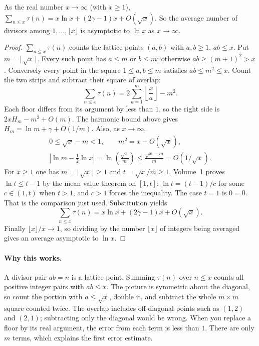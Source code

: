 \begin{theorem}[Dirichlet]\label{thm:hyperbola}
As the real number $x\to\infty$ (with $x\ge1$),
$\displaystyle\sum_{n\le x}\tau(n)=x\ln x+(2\gamma-1)x+O(\sqrt x)$. So the average number of divisors among $1,\dots,\lfloor x\rfloor$ is asymptotic to $\ln x$ as $x\to\infty$.
\end{theorem}
\begin{proof}
$\sum_{n\le x}\tau(n)$ counts the lattice points $(a,b)$ with $a,b\ge1$, $ab\le x$. Put $m=\lfloor\sqrt x\rfloor$.
Every such point has $a\le m$ or $b\le m$: otherwise
$ab\ge(m+1)^2>x$. Conversely every point in the square
$1\le a,b\le m$ satisfies $ab\le m^2\le x$.
Count the two strips and subtract their square of overlap:
\[
\sum_{n\le x}\tau(n)=2\sum_{a=1}^m\left\lfloor\frac xa\right\rfloor-m^2.
\]
Each floor differs from its argument by less than $1$, so
the right side is $2xH_m-m^2+O(m)$.
The harmonic bound above gives $H_m=\ln m+\gamma+O(1/m)$.
Also, as $x\to\infty$,
\[
\begin{gathered}
0\le\sqrt x-m<1,\qquad
m^2=x+O(\sqrt x),\\
\left|\ln m-\tfrac12\ln x\right|
=\ln\left(\frac{\sqrt x}{m}\right)
\le\frac{\sqrt x-m}{m}=O(1/\sqrt x).
\end{gathered}
\]
For $x\ge1$ one has $m=\lfloor\sqrt x\rfloor\ge1$ and $t=\sqrt x/m\ge1$. Volume~1 proves $\ln t\le t-1$ by the mean value theorem on $[1,t]$: $\ln t=(t-1)/c$ for some $c\in(1,t)$ when $t>1$, and $c>1$ forces the inequality. The case $t=1$ is $0=0$. That is the comparison just used.
Substitution yields
\[
\sum_{n\le x}\tau(n)
=x\ln x+(2\gamma-1)x+O(\sqrt x).
\]
Finally $\lfloor x\rfloor/x\to1$, so dividing by the number
$\lfloor x\rfloor$ of integers being averaged gives an average
asymptotic to $\ln x$.
\end{proof}

\paragraph{Why this works.}
A divisor pair $ab=n$ is a lattice point. Summing $\tau(n)$ over $n\le x$ counts all positive integer pairs with $ab\le x$. The picture is symmetric about the diagonal, so count the portion with $a\le\sqrt x$, double it, and subtract the whole $m\times m$ square counted twice. The overlap includes off-diagonal points such as $(1,2)$ and $(2,1)$; subtracting only the diagonal would be wrong. When you replace a floor by its real argument, the error from each term is less than $1$. There are only $m$ terms, which explains the first error estimate.

